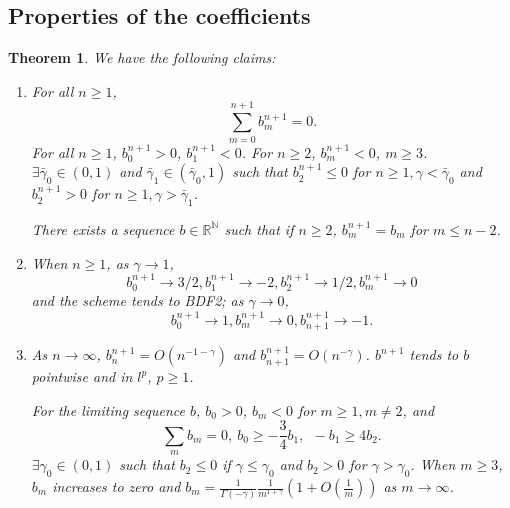 \documentclass[11pt]{article}
\newtheorem{thm}{Theorem}
\begin{document}
\subsection{Properties of the coefficients}
\begin{thm}
We have the following claims:
\begin{enumerate}
\item 
For all $n\ge 1$, $$
\sum_{m=0}^{n+1}b_m^{n+1}=0.
$$ 
For all $n\ge 1$, $b_0^{n+1}>0$, $b_1^{n+1}<0$. For $n\ge 2$, $b_m^{n+1}<0$, $m\ge 3$. $\exists \bar{\gamma}_0\in (0, 1)$ and $\bar{\gamma}_1\in(\bar{\gamma}_0, 1)$ such that $b_2^{n+1}\le 0$ for $n\ge 1, \gamma<\bar{\gamma}_0$ and $b_2^{n+1}>0$ for $n\ge 1, \gamma>\bar{\gamma}_1$.


There exists a sequence $b\in \mathbb{R}^{\mathbb{N}}$ such that if $n\ge 2$, $b_m^{n+1}=b_m$ for $m\le n-2$.

\item 
When $n\ge 1$, as $\gamma\to 1$, $$
b_0^{n+1}\to 3/2, b_1^{n+1}\to -2, b_2^{n+1}\to 1/2, b_m^{n+1}\to 0
$$
and the scheme tends to BDF2; as $\gamma\to 0$, $$
b_0^{n+1}\to 1, b_m^{n+1}\to 0 ,b_{n+1}^{n+1}\to -1.
$$
\item As $n\to \infty$, $b_n^{n+1}=O(n^{-1-\gamma})$ and $b_{n+1}^{n+1}=O(n^{-\gamma})$. $b^{n+1}$ tends to
$b$ pointwise and in $l^p$, $p\ge 1$. 

For the limiting sequence $b$, $b_0>0$, $b_m<0$
for $m\ge 1, m\neq 2$, and $$
\sum_m b_m=0,\ 
b_0\ge -\frac{3}{4}b_1,\ \ -b_1\ge 4b_2.
$$
$\exists\gamma_0\in (0,1)$ such that $b_2\le 0$ if $\gamma\le \gamma_0$ and $b_2>0$ for $\gamma>\gamma_0$. 
When $m\ge 3$, $b_m$ increases to zero and $b_m=\frac{1}{\Gamma(-\gamma)}\frac{1}{m^{1+\gamma}}\left(1+O(\frac{1}{m})\right)$ as $m\to\infty$.
\end{enumerate}
\end{thm}
\end{document}
